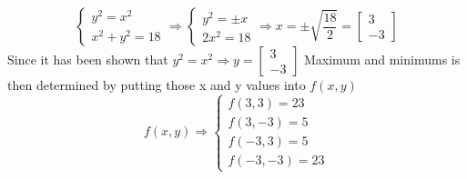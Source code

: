 \[
\begin{cases}
    y^2 = x^2\\
    x^2+y^2=18
\end{cases}
\Rightarrow
\begin{cases}
    y^2 = \pm x\\
    2x^2 = 18
\end{cases}
\Rightarrow
    x = \pm \sqrt{\frac{18}{2}} = \begin{bmatrix}
        3\\-3
    \end{bmatrix}
\]
Since it has been shown that $y^2=x^2 \Rightarrow y = \begin{bmatrix}3\\-3\end{bmatrix}$
Maximum and minimums is then determined by putting those x and y values into $f(x,y)$
\[f(x,y) \Rightarrow 
\begin{cases}
    f(3,3) = 23\\
    f(3,-3) = 5\\
    f(-3,3) = 5\\
    f(-3,-3) = 23
\end{cases}\]
\[\]
